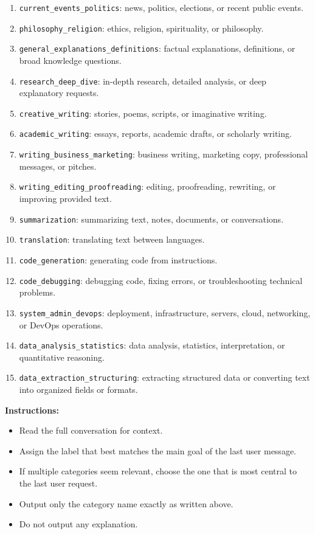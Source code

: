 \documentclass{article}
\begin{document}
\begin{tcolorbox}
\begin{enumerate}
    \item \texttt{current\_events\_politics}: news, politics, elections, or recent public events.
    \item \texttt{philosophy\_religion}: ethics, religion, spirituality, or philosophy.
    \item \texttt{general\_explanations\_definitions}: factual explanations, definitions, or broad knowledge questions.
    \item \texttt{research\_deep\_dive}: in-depth research, detailed analysis, or deep explanatory requests.
    \item \texttt{creative\_writing}: stories, poems, scripts, or imaginative writing.
    \item \texttt{academic\_writing}: essays, reports, academic drafts, or scholarly writing.
    \item \texttt{writing\_business\_marketing}: business writing, marketing copy, professional messages, or pitches.
    \item \texttt{writing\_editing\_proofreading}: editing, proofreading, rewriting, or improving provided text.
    \item \texttt{summarization}: summarizing text, notes, documents, or conversations.
    \item \texttt{translation}: translating text between languages.
    \item \texttt{code\_generation}: generating code from instructions.
    \item \texttt{code\_debugging}: debugging code, fixing errors, or troubleshooting technical problems.
    \item \texttt{system\_admin\_devops}: deployment, infrastructure, servers, cloud, networking, or DevOps operations.
    \item \texttt{data\_analysis\_statistics}: data analysis, statistics, interpretation, or quantitative reasoning.
    \item \texttt{data\_extraction\_structuring}: extracting structured data or converting text into organized fields or formats.
\end{enumerate}

\textbf{Instructions:}
\begin{itemize}
    \item Read the full conversation for context.
    \item Assign the label that best matches the main goal of the last user message.
    \item If multiple categories seem relevant, choose the one that is most central to the last user request.
    \item Output only the category name exactly as written above.
    \item Do not output any explanation.
\end{itemize}


\end{tcolorbox}
\end{document}
